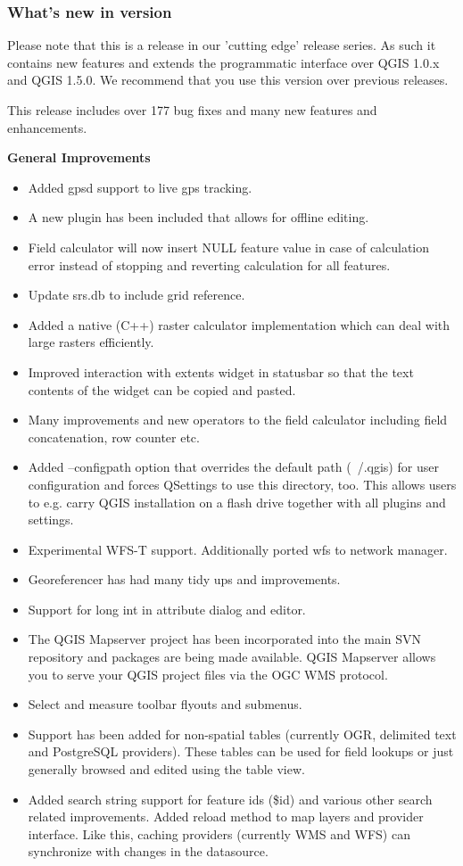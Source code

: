 \subsubsection{What's new in version \CURRENT} 

Please note that this is a release in our 'cutting edge' release series. As such 
it contains new features and extends the programmatic interface over QGIS 1.0.x 
and QGIS 1.5.0. We recommend that you use this version over previous releases.

This release includes over 177 bug fixes and many new features and enhancements. 

\textbf{General Improvements}

\begin{itemize}[label=--]
\item Added gpsd support to live gps tracking.
\item A new plugin has been included that allows for offline editing.
\item Field calculator will now insert NULL feature value in case of calculation error instead of stopping and reverting calculation for all features.
\item Update srs.db to include grid reference.
\item Added a native (C++) raster calculator implementation which can deal with large rasters efficiently.
\item Improved interaction with extents widget in statusbar so that the text contents of the widget can be copied and pasted.
\item Many improvements and new operators to the field calculator including field concatenation, row counter etc.
\item Added --configpath option that overrides the default path (~/.qgis) for user configuration and forces QSettings to use this directory, too. This allows users to e.g. carry QGIS installation on a flash drive together with all plugins and settings.
\item Experimental WFS-T support. Additionally ported wfs to network manager.
\item Georeferencer has had many tidy ups and improvements.
\item Support for long int in attribute dialog and editor.
\item The QGIS Mapserver project has been incorporated into the main SVN repository and packages are being made available. QGIS Mapserver allows you to serve your QGIS project files via the OGC WMS protocol.
\item Select and measure toolbar flyouts and submenus.
\item Support has been added for non-spatial tables (currently OGR, delimited text and PostgreSQL providers). These tables can be used for field lookups or just generally browsed and edited using the table view.
\item Added search string support for feature ids (\$id) and various other search related improvements.
Added reload method to map layers and provider interface. Like this, caching providers (currently WMS and WFS) can synchronize with changes in the datasource.
\end{itemize}

